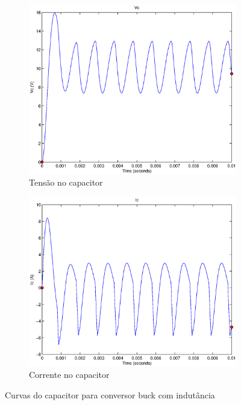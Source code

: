 \documentclass{article}
\begin{document}
\begin{figure}[H]
	\centering
	\begin{subfigure}[b]{0.4\linewidth}
		\includegraphics[width=\linewidth]{matlab/buck/b_vc2}
		\caption{Tensão no capacitor}
	\end{subfigure}
	\begin{subfigure}[b]{0.4\linewidth}
		\centering
		\includegraphics[width=\linewidth]{matlab/buck/b_ic2}
		\caption{Corrente no capacitor}
	\end{subfigure}
	\caption{Curvas do capacitor para conversor buck com indutância }
	\label{fig:bc2}
\end{figure}
\end{document}
